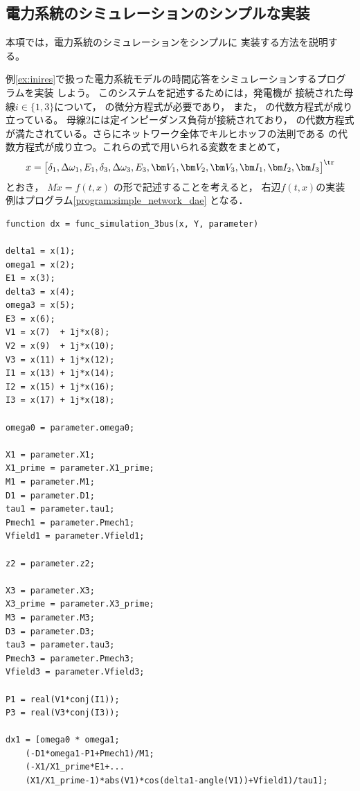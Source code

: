 \documentclass[tombow,dvipdfmx]{corona-a5-1.1}
\begin{document}
\subsection{電力系統のシミュレーションのシンプルな実装}
本項では，電力系統のシミュレーションをシンプルに
実装する方法を説明する。
\begin{例}[電力系統のシミュレーションのシンプルな実装]\label{ex:dae_ex2}
例\ref{ex:inires}で扱った電力系統モデルの時間応答をシミュレーションするプログラムを実装
しよう。
このシステムを記述するためには，発電機が
接続された母線$i\in \{1, 3\}$について，
の微分方程式が必要であり，
また，
の代数方程式が成り立っている。
母線2には定インピーダンス負荷が接続されており，
の代数方程式が満たされている。さらにネットワーク全体でキルヒホッフの法則である
の代数方程式が成り立つ。これらの式で用いられる変数をまとめて，
\begin{align*}
x = \begin{bmatrix}
  \delta_1, \Delta\omega_1, E_1, \delta_3, \Delta\omega_3, E_3, \bm V_1, \bm V_2, \bm V_3, \bm I_1, \bm I_2, \bm I_3
\end{bmatrix}^\tr
\end{align*}
とおき，
$M\dot{x} = f(t, x)$
の形で記述することを考えると，
右辺$f(t, x)$の実装例はプログラム\nobreak\ref{program:simple_network_dae}
となる．
\begin{PROGRAMA}[count,title={func\_simulation\_3bus.m}]\label{program:simple_network_dae}
\begin{verbatim}
function dx = func_simulation_3bus(x, Y, parameter)

delta1 = x(1);
omega1 = x(2);
E1 = x(3);
delta3 = x(4);
omega3 = x(5);
E3 = x(6);
V1 = x(7)  + 1j*x(8);
V2 = x(9)  + 1j*x(10);
V3 = x(11) + 1j*x(12);
I1 = x(13) + 1j*x(14);
I2 = x(15) + 1j*x(16);
I3 = x(17) + 1j*x(18);

omega0 = parameter.omega0;

X1 = parameter.X1;
X1_prime = parameter.X1_prime;
M1 = parameter.M1;
D1 = parameter.D1;
tau1 = parameter.tau1;
Pmech1 = parameter.Pmech1;
Vfield1 = parameter.Vfield1;

z2 = parameter.z2;

X3 = parameter.X3;
X3_prime = parameter.X3_prime;
M3 = parameter.M3;
D3 = parameter.D3;
tau3 = parameter.tau3;
Pmech3 = parameter.Pmech3;
Vfield3 = parameter.Vfield3;

P1 = real(V1*conj(I1));
P3 = real(V3*conj(I3));

dx1 = [omega0 * omega1;
    (-D1*omega1-P1+Pmech1)/M1;
    (-X1/X1_prime*E1+...
    (X1/X1_prime-1)*abs(V1)*cos(delta1-angle(V1))+Vfield1)/tau1];


\end{verbatim}
\end{PROGRAMA}
\end{例}
\end{document}

